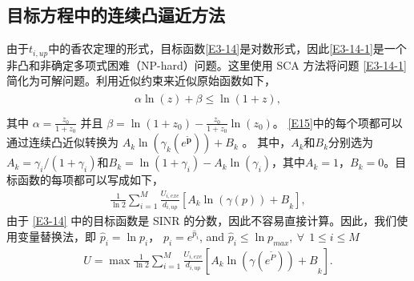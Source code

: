 \subsection{目标方程中的连续凸逼近方法}\label{section3-3-1}
由于$t_{i,up}$中的香农定理的形式，目标函数\eqref{E3-14}是对数形式，因此\eqref{E3-14-1}是一个非凸和非确定多项式困难（NP-hard）问题。这里使用 SCA 方法将问题 \eqref{E3-14-1} 简化为可解问题。利用近似约束来近似原始函数如下，
\begin{eqnarray}\label{E15}
\begin{array}{ll}
\alpha \ln{\left(z\right)}+\beta\le \ln{\left(1+z\right)},\\
\end{array}
\end{eqnarray}
其中 $\alpha=\frac{z_0}{1+z_0}$ 并且 $\beta=\ln{\left(1+z_0\right)}-\frac{z_0}{1+z_0}\ln{\left(z_0\right)}$。 \eqref{E15}中的每个项都可以通过连续凸近似转换为 $A_k\ln\left(\gamma_k\left(e^{\widetilde{\mathbf{p}}}\right)\right)+B_k$ 。 其中，$A_k$和$B_k$分别选为$A_k=\gamma_i/\left(1+\gamma_i\right)$和$B_k=\ln{\left(1+\gamma_i\right)}-A_k\ln{\left(\gamma_i\right)}$，其中$A_k=1$，$B_k=0$。目标函数的每项都可以写成如下，
\begin{eqnarray}\label{E16}
\frac{1}{\ln{2}}\sum_{i=1}^{M}{\frac{U_{i,exe}}{d_{i,up}}\left.\left[{A_k\ln{\left(\gamma\left(p\right)\right)}+B}_k\right.\right]},
\end{eqnarray}
由于 \eqref{E3-14} 中的目标函数是 SINR 的分数，因此不容易直接计算。因此，我们使用变量替换法，即 ${\hat{p}}_i=\ln{p_i}$，
$p_i=e^{{\hat{p}}_i}$, and ${\hat{p}}_i\le \ln{p_{max}},\ \forall\ \ 1\le i\le M$
\begin{eqnarray}\label{E17}
U=\max\frac{1}{\ln{2}}\sum_{i=1}^{M}\left.\frac{U_{i,exe}}{d_{i,up}}\left[{A_k\ln{\left(\gamma\left(e^{\widetilde{P}}\right)\right)}+B}_k\right.\right].
\end{eqnarray}

